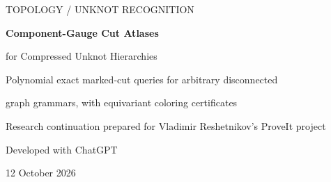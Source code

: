 \documentclass[11pt,letterpaper]{article}
\theoremstyle{definition}
\theoremstyle{remark}\newtheorem{remark}[theorem]{Remark}
\begin{document}
\begin{titlepage}
\vspace*{0.18in}
{\large\sffamily\color{ink} TOPOLOGY / UNKNOT RECOGNITION\par}
\vspace{0.25in}
{\LARGE\bfseries Component-Gauge Cut Atlases\par}
\vspace{0.12in}
{\Large for Compressed Unknot Hierarchies\par}
\vspace{0.25in}
{\large Polynomial exact marked-cut queries for arbitrary disconnected\par
 graph grammars, with equivariant coloring certificates\par}
\vspace{0.30in}
{Research continuation prepared for Vladimir Reshetnikov's ProveIt project\par
 Developed with ChatGPT\par}
{12 October 2026\par}
\vspace{0.24in}
\begin{abstract}
The preceding sparse-cut grammar report obtains polynomial fixed-threshold evaluation for connected pieces, but retains an exponential factor in the number of terminal-bearing components. It explicitly asks whether this factor can be removed by a structured response. We resolve that question for its edge-owned graph-grammar model.

A component-gauge atlas records terminal colors relative to one root per connected component, together with root-relative monochromatic-edge flags. Independent component color flips remain symbolic. Gluing imposes XOR equations; forgetting a component eliminates its free color through a four-state OR computation. For a piece with $r$ terminals, the number of rows of exact cut cost $d$ is at most
\[
 4(d+1)\max\{1,8r\}^{d}.
\]
A shared-budget argument bounds candidate pairs by a degree-$k$ polynomial in interface size. Consequently every supplied positive-integral-capacity, fresh-copy graph grammar admits deterministic polynomial-time exact evaluation at each fixed threshold $k$, without a connectedness, component-count, or nesting-depth restriction. In particular this applies to the two-edge-mark query at threshold three.


\end{abstract}
\end{titlepage}
\end{document}
